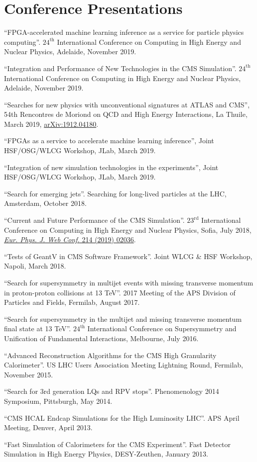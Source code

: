 \section{Conference Presentations}
\begin{description}[leftmargin=12pt,font=\normalfont,labelsep=0em]
\item ``FPGA-accelerated machine learning inference as a service for particle physics computing''. $24^{\text{th}}$ International Conference on Computing in High Energy and Nuclear Physics, Adelaide, November 2019.
\item ``Integration and Performance of New Technologies in the CMS Simulation''. $24^{\text{th}}$ International Conference on Computing in High Energy and Nuclear Physics, Adelaide, November 2019.
\item ``Searches for new physics with unconventional signatures at ATLAS and CMS'', 54th Rencontres de Moriond on QCD and High Energy Interactions, La Thuile, March 2019, \href{https://arxiv.org/abs/1912.04180}{arXiv:1912.04180}.
\item ``FPGAs as a service to accelerate machine learning inference'', Joint HSF/OSG/WLCG Workshop, JLab, March 2019.
\item ``Integration of new simulation technologies in the experiments'', Joint HSF/OSG/WLCG Workshop, JLab, March 2019.
\item ``Search for emerging jets''. Searching for long-lived particles at the LHC, Amsterdam, October 2018.
\item ``Current and Future Performance of the CMS Simulation''. $23^{\text{rd}}$ International Conference on Computing in High Energy and Nuclear Physics, Sofia, July 2018, \href{https://doi.org/10.1051/epjconf/201921402036}{\emph{Eur. Phys. J. Web Conf.} 214 (2019) 02036}.
\item ``Tests of GeantV in CMS Software Framework''. Joint WLCG \& HSF Workshop, Napoli, March 2018.
\item ``Search for supersymmetry in multijet events with missing transverse momentum in proton-proton collisions at 13 TeV''. 2017 Meeting of the APS Division of Particles and Fields, Fermilab, August 2017.
\item ``Search for supersymmetry in the multijet and missing transverse momentum final state at 13 TeV''. $24^{\text{th}}$ International Conference on Supersymmetry and Unification of Fundamental Interactions, Melbourne, July 2016.
\item ``Advanced Reconstruction Algorithms for the CMS High Granularity Calorimeter''. US LHC Users Association Meeting Lightning Round, Fermilab, November 2015.
\item ``Search for 3rd generation LQs and RPV stops''. Phenomenology 2014 Symposium, Pittsburgh, May 2014.
\item ``CMS HCAL Endcap Simulations for the High Luminosity LHC''. APS April Meeting, Denver, April 2013.
\item ``Fast Simulation of Calorimeters for the CMS Experiment''. Fast Detector Simulation in High Energy Physics, DESY-Zeuthen, January 2013.
\end{description}

